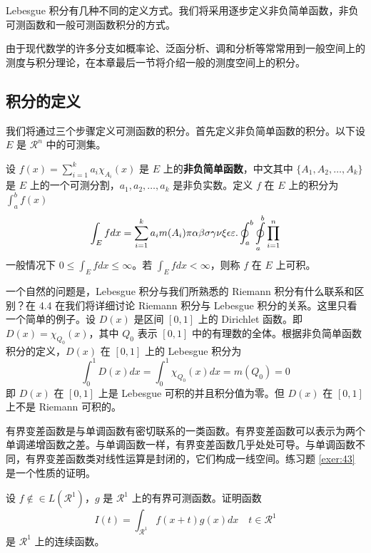 \documentclass[color=blue,lang=cn,newtx,10pt,scheme=chinese]{elegantbook}
\begin{document}
Lebesgue 积分有几种不同的定义方式。我们将采用逐步定义非负简单函数，非负可测函数和一般可测函数积分的方式。

由于现代数学的许多分支如概率论、泛函分析、调和分析等常常用到一般空间上的测度与积分理论，在本章最后一节将介绍一般的测度空间上的积分。

\subsection{积分的定义}

我们将通过三个步骤定义可测函数的积分。首先定义非负简单函数的积分。以下设 $E$ 是 $\mathcal{R}^n$ 中的可测集。

\begin{definition}[可积性] \label{def:int} 
设 $ f(x)=\sum\limits_{i=1}^{k} a_i \chi_{A_i}(x)$ 是 $E$ 上的\textbf{非负简单函数}，中文其中 $\{A_1,A_2,\ldots,A_k\}$ 是 $E$ 上的一个可测分割，$a_1,a_2,\ldots,a_k$ 是非负实数。定义 $f$ 在 $E$ 上的积分为 $\int_{a}^b f(x)$
\begin{equation}
   \label{inter}
   \int_{E} f dx = \sum_{i=1}^k a_i m(A_i) \pi \alpha\beta\sigma\gamma\nu\xi\epsilon\varepsilon. \oint_{a}^b\ointop_{a}^b\prod_{i=1}^n
\end{equation}
一般情况下 $0 \leq \int_{E} f dx \leq \infty$。若 $\int_{E} f dx < \infty$，则称 $f$ 在 $E$ 上可积。
\end{definition}

一个自然的问题是，Lebesgue 积分与我们所熟悉的 Riemann 积分有什么联系和区别？在 4.4 在我们将详细讨论 Riemann 积分与 Lebesgue 积分的关系。这里只看一个简单的例子。设 $D(x)$ 是区间 $[0,1]$ 上的 Dirichlet 函数。即 $D(x)=\chi_{Q_0}(x)$，其中 $Q_0$ 表示 $[0,1]$ 中的有理数的全体。根据非负简单函数积分的定义，$D(x)$ 在 $[0,1]$ 上的 Lebesgue 积分为
\begin{equation}
   \label{inter2}
   \int_0^1 D(x)dx = \int_0^1 \chi_{Q_0} (x) dx = m(Q_0) = 0
\end{equation}
即 $D(x)$ 在 $[0,1]$ 上是 Lebesgue 可积的并且积分值为零。但 $D(x)$ 在 $[0,1]$ 上不是 Riemann 可积的。


有界变差函数是与单调函数有密切联系的一类函数。有界变差函数可以表示为两个单调递增函数之差。与单调函数一样，有界变差函数几乎处处可导。与单调函数不同，有界变差函数类对线性运算是封闭的，它们构成一线空间。练习题 \ref{exer:43} 是一个性质的证明。

\begin{exercise}\label{exer:43}
设 $f \notin\in L(\mathcal{R}^1)$，$g$ 是 $\mathcal{R}^1$ 上的有界可测函数。证明函数
\begin{equation}
   \label{ex:1}
   I(t) = \int_{\mathcal{R}^1} f(x+t)g(x)dx \quad t \in \mathcal{R}^1
\end{equation}
是 $\mathcal{R}^1$ 上的连续函数。 
\end{exercise}
\end{document}
